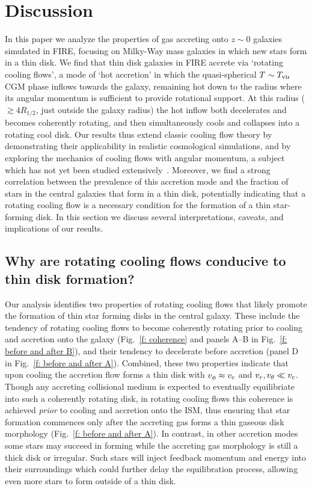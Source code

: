 \documentclass[fleqn,usenatbib]{mnras}
\newcommand{\Tvir}{T_{\rm vir}}
\begin{document}
\section{Discussion}
\label{s: discussion}

In this paper we analyze the properties of gas accreting onto $z\sim0$ galaxies simulated in FIRE, focusing on Milky-Way mass galaxies in which new stars form in a thin disk. 
We find that thin disk galaxies in FIRE accrete via `rotating cooling flows', a mode of `hot accretion' in which the quasi-spherical $T\sim\Tvir$ CGM phase inflows towards the galaxy, remaining hot down to the radius where its angular momentum is sufficient to provide rotational support.
At this radius ($\gtrsim 4 R_{1/2}$, just outside the galaxy radius) the hot inflow both decelerates and becomes coherently rotating, and then simultaneously cools and collapses into a rotating cool disk.
Our results thus extend classic cooling flow theory by demonstrating their applicability in realistic cosmological simulations, and by exploring the mechanics of cooling flows with angular momentum, a subject which has not yet been studied extensively~\citep[c.f.][]{Cowie1980, Stern2019}.
Moreover, we find a strong correlation between the prevalence of this accretion mode and the fraction of stars in the central galaxies that form in a thin disk, potentially indicating that a rotating cooling flow is a necessary condition for the formation of a thin star-forming disk.
In this section we discuss several interpretations, caveats, and implications of our results. 

\subsection{Why are rotating cooling flows conducive to thin disk formation?}
\label{s: why CFs thin disks}

Our analysis identifies two properties of rotating cooling flows that likely promote the formation of thin star forming disks in the central galaxy.
These include the tendency of rotating cooling flows to become coherently rotating prior to cooling and accretion onto the galaxy (Fig.~\ref{f: coherence} and panels A--B in Fig.~\ref{f: before and after B}),
and their tendency to decelerate before accretion (panel D in Fig.~\ref{f: before and after A}).
Combined, these two properties indicate that upon cooling the accretion flow forms a thin disk with $v_\phi\approx v_{\rm c}$ and $v_r, v_\theta \ll v_{\rm c}$. 
Though any accreting collisional medium is expected to eventually equilibriate into such a coherently rotating disk, in rotating cooling flows this coherence is achieved \textit{prior} to cooling and accretion onto the ISM, thus ensuring that star formation commences only after the accreting gas forms a thin gaseous disk morphology (Fig.~\ref{f: before and after A}).
In contrast, in other accretion modes some stars may succeed in forming while the accreting gas morphology is still a thick disk or irregular.
Such stars will inject feedback momentum and energy into their surroundings which could further delay the equilibration process, allowing even more stars to form outside of a thin disk. 
\end{document}
